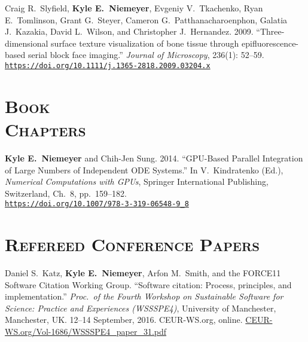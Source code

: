 \documentclass[margin,line,11pt]{res}
\makeatletter
\newlength{\bibhang}
\newlength{\bibsep}
 {\@listi \global\bibsep\itemsep \global\advance\bibsep by\parsep}
\newenvironment{bibenum*}
  {\renewcommand\labelenumi{\theenumi.}%
   \etaremune[
     topsep=0pt,
     itemsep=\bibsep,
     parsep=0pt,partopsep=0pt,
     itemindent=-\bibhang,
     leftmargin={\bibhang+\widthof{[999]}}]}
  {\endetaremune}
\newcommand*{\doi}[1]{\href{https://doi.org/#1}{\nolinkurl{https://doi.org/#1}}}
\makeatother
\begin{document}
\begin{resume}
\begin{bibenum*}
\item Craig R.\ Slyfield, \textbf{Kyle E.\ Niemeyer}, Evgeniy V.\ Tkachenko, Ryan E.\ Tomlinson, Grant G.\ Steyer, Cameron G.\ \mbox{Patthanacharoenphon}, Galatia J.\ Kazakia, David L.\ Wilson, and Christopher J.\ Hernandez.
2009.
``Three-dimensional surface texture visualization of bone tissue through epifluorescence-based serial block face imaging.''
\emph{Journal of Microscopy}, 236(1): 52--59.
\doi{10.1111/j.1365-2818.2009.03204.x}

\end{bibenum*}

\section{\textsc{Book\\Chapters}}

\begin{bibenum*}

\item \textbf{Kyle E.\ Niemeyer} and Chih-Jen Sung.
2014.
``GPU-Based Parallel Integration of Large Numbers of Independent ODE Systems.''
In V.\ Kindratenko (Ed.), \emph{Numerical Computations with GPUs}, Springer International Publishing, Switzerland, Ch.\ 8, pp.\ 159--182. \\
\doi{10.1007/978-3-319-06548-9_8}

\end{bibenum*}

\section{\textsc{Refereed Conference Papers}}

\begin{bibenum*}

\item Daniel S.\ Katz, \textbf{Kyle E.\ Niemeyer}, Arfon M.\ Smith, and the FORCE11 Software Citation Working Group.
``Software citation: Process, principles, and implementation.''
\emph{Proc.\ of the Fourth Workshop on Sustainable Software for Science: Practice and Experiences (WSSSPE4)},
University of Manchester, Manchester, UK.
12--14 September, 2016.
CEUR-WS.org, online.
\href{http://ceur-ws.org/Vol-1686/WSSSPE4_paper_31.pdf}{CEUR-WS.org/Vol-1686/WSSSPE4\_paper\_31.pdf}


\end{bibenum*}
\end{resume}
\end{document}
